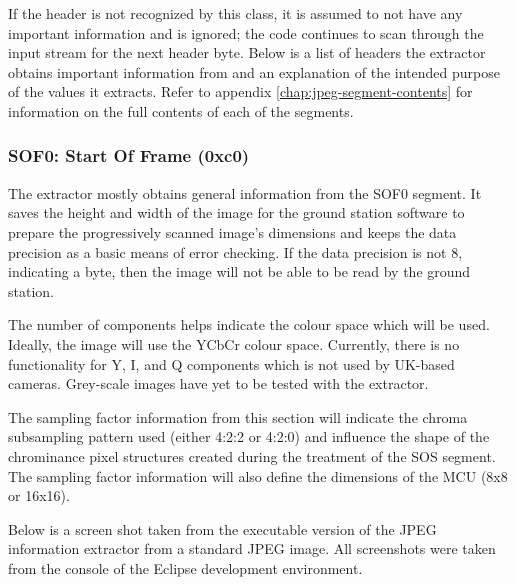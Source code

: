 If the header is not recognized by this class, 
it is assumed to not have any important information and is ignored; 
the code continues to scan through the input stream for the next header byte. 
Below is a list of headers the extractor obtains important information from 
and an explanation of the intended purpose of the values it extracts. 
Refer to appendix \ref{chap:jpeg-segment-contents} for information on the full contents of each
of the segments.

\subsubsection{SOF0: Start Of Frame (0xc0)}

The extractor mostly obtains general information from the SOF0 segment. 
It saves the height and width of the image for the ground station
software to prepare the progressively scanned image's dimensions
and keeps the data precision as a basic means of error checking. 
If the data precision is not 8, indicating a byte, then the image will not
be able to be read by the ground station.

The number of components helps indicate the colour space which will
be used. Ideally, the image will use the YCbCr colour space. Currently,
there is no functionality for Y, I, and Q components  which is not
used by UK-based cameras. Grey-scale images have yet to be
tested with the extractor.

The sampling factor information from this section will indicate
the chroma subsampling pattern used (either 4:2:2 or 4:2:0)
and influence the shape of the chrominance pixel structures
created during the treatment of the SOS segment. The 
sampling factor information will also define the dimensions of the
MCU (8x8 or 16x16).

Below is a screen shot taken from the executable version of
the JPEG information extractor from a standard JPEG image.
All screenshots were taken from the console of the Eclipse
development environment.

